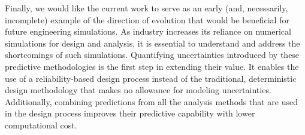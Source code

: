 Finally, we would like the current work to serve as an early (and, necessarily, incomplete) example of the direction of evolution that would be beneficial for future engineering simulations. As industry increases its reliance on numerical simulations for design and analysis, it is essential to understand and address the shortcomings of such simulations. Quantifying uncertainties introduced by these predictive methodologies is the first step in extending their value. It enables the use of a reliability-based design process instead of the traditional, deterministic design methodology that makes no allowance for modeling uncertainties. Additionally, combining predictions from all the analysis methods that are used in the design process improves their predictive capability with lower computational cost. 
